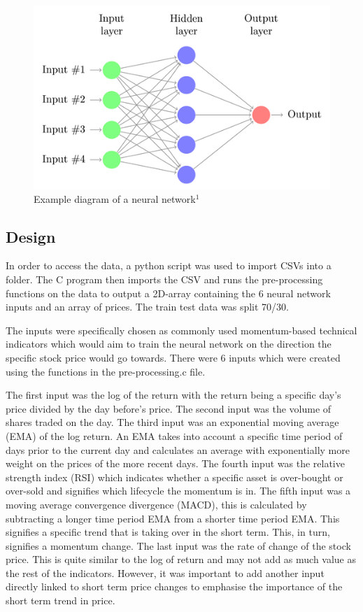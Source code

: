 \documentclass[11pt]{article}
\begin{document}
\begin{figure}[h]
\center
\includegraphics[scale=0.5]{neural-network}
\caption{Example diagram of a neural network$^1$}
\end{figure}

\subsection{Design}
In order to access the data, a python script was used to import CSVs into a folder. The C program then imports the CSV and runs the pre-processing functions on the data to output a 2D-array containing the 6 neural network inputs and an array of prices. The train test data was split 70/30.

The inputs were specifically chosen as commonly used momentum-based technical indicators which would aim to train the neural network on the direction the specific stock price would go towards. There were 6 inputs which were created using the functions in the pre-processing.c file. 

The first input was the log of the return with the return being a specific day's price divided by the day before's price. The second input was the volume of shares traded on the day. The third input was an exponential moving average (EMA) of the log return. An EMA takes into account a specific time period of days prior to the current day and calculates an average with exponentially more weight on the prices of the more recent days. The fourth input was the relative strength index (RSI) which indicates whether a specific asset is over-bought or over-sold and signifies which lifecycle the momentum is in. The fifth input was a moving average convergence divergence (MACD), this is calculated by subtracting a longer time period EMA from a shorter time period EMA. This signifies a specific trend that is taking over in the short term. This, in turn, signifies a momentum change. The last input was the rate of change of the stock price. This is quite similar to the log of return and may not add as much value as the rest of the indicators. However, it was important to add another input directly linked to short term price changes to emphasise the importance of the short term trend in price.
\end{document}
